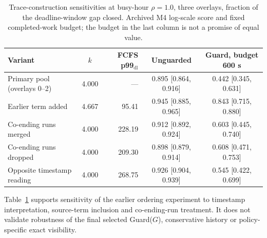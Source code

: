 \documentclass[mathematics,supfile,submit,moreauthors]{Definitions/mdpi}
\newcommand{\devnum}[1]{#1}
\begin{document}
\begin{table}[htbp]
\centering
\caption{Trace-construction sensitivities at busy-hour $\rho = \devnum{1.0}$, three overlays,
fraction of the deadline-window gap closed. Archived M4 log-scale score and fixed
completed-work budget; the budget in the last column is not a promise of equal value.}
\label{tab:s_sens}
\small
\setlength{\tabcolsep}{4pt}
\begin{tabular}{lcrcc}
\toprule
Variant & $k$ & FCFS p99$_{\mathrm{dl}}$ & Unguarded & Guard, budget \devnum{600} s \\
\midrule
Primary pool (overlays 0--2) & \devnum{4.000} & --- & \devnum{0.895 [0.864, 0.916]} & \devnum{0.442 [0.345, 0.631]} \\
Earlier term added           & \devnum{4.667} & \devnum{95.41}  & \devnum{0.945 [0.885, 0.965]} & \devnum{0.843 [0.715, 0.880]} \\
Co-ending runs merged        & \devnum{4.000} & \devnum{228.19} & \devnum{0.912 [0.892, 0.924]} & \devnum{0.603 [0.445, 0.740]} \\
Co-ending runs dropped       & \devnum{4.000} & \devnum{209.30} & \devnum{0.898 [0.879, 0.914]} & \devnum{0.608 [0.471, 0.753]} \\
Opposite timestamp reading   & \devnum{4.000} & \devnum{268.75} & \devnum{0.926 [0.904, 0.939]} & \devnum{0.545 [0.422, 0.699]} \\
\bottomrule
\end{tabular}
\end{table}

Table~\ref{tab:s_sens} supports sensitivity of the earlier ordering experiment to
timestamp interpretation, source-term inclusion and co-ending-run treatment. It does
not validate robustness of the final selected Guard($G$), conservative history or
policy-specific exact visibility.
\end{document}
